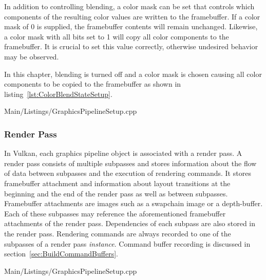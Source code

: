         In addition to controlling blending, a color mask can be set that controls which components of the resulting color values are written to the framebuffer.
        If a color mask of 0 is supplied, the framebuffer contents will remain unchanged.
        Likewise, a color mask with all bits set to 1 will copy all color components to the framebuffer.
        It is crucial to set this value correctly, otherwise undesired behavior may be observed.

        In this chapter, blending is turned off and a color mask is chosen causing all color components to be copied to the framebuffer as shown in listing~\ref{lst:ColorBlendStateSetup}.

        
        {Main/Listings/GraphicsPipelineSetup.cpp}


      \subsubsection{Render Pass}
      \label{sss:RenderPassSetup}
        In Vulkan, each graphics pipeline object is associated with a render pass.
        A render pass consists of multiple subpasses and stores information about the flow of data between subpasses and the execution of rendering commands.
        It stores framebuffer attachment and information about layout transitions at the beginning and the end of the render pass as well as between subpasses.
        Framebuffer attachments are images such as a swapchain image or a depth-buffer.
        Each of these subpasses may reference the aforementioned framebuffer attachments of the render pass.
        Dependencies of each subpass are also stored in the render pass.
        Rendering commands are always recorded to one of the subpasses of a render pass \textit{instance}.
        Command buffer recording is discussed in section~\ref{sec:BuildCommandBuffers}.


        
        {Main/Listings/GraphicsPipelineSetup.cpp}

